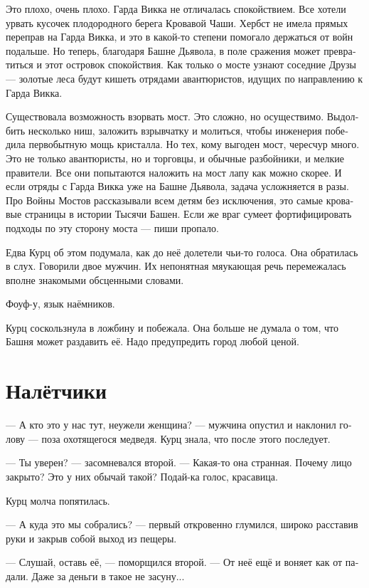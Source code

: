 \documentclass[a4paper,10pt,fleqn]{book}\usepackage{polyglossia}\setdefaultlanguage[babelshorthands=true]{russian}\setotherlanguage{english}\defaultfontfeatures{Ligatures=TeX,Mapping=tex-text}\usepackage{xcolor}\newcommand{\ml}[3]{#2}
\begin{document}
Это плохо, очень плохо.
Гарда Викка не отличалась спокойствием.
Все хотели урвать кусочек плодородного берега Кровавой Чаши.
Хербст не имела прямых переправ на Гарда Викка, и это в какой-то степени помогало держаться от войн подальше.
Но теперь, благодаря Башне Дьявола, в поле сражения может превратиться и этот островок спокойствия.
Как только о мосте узнают соседние Друзы --- золотые леса будут кишеть отрядами авантюристов, идущих по направлению к Гарда Викка.

Существовала возможность взорвать мост.
Это сложно, но осуществимо.
Выдолбить несколько ниш, заложить взрывчатку и молиться, чтобы инженерия победила первобытную мощь кристалла.
Но тех, кому выгоден мост, чересчур много.
Это не только авантюристы, но и торговцы, и обычные разбойники, и мелкие правители.
Все они попытаются наложить на мост лапу как можно скорее.
И если отряды с Гарда Викка уже на Башне Дьявола, задача усложняется в разы.
Про Войны Мостов рассказывали всем детям без исключения, это самые кровавые страницы в истории Тысячи Башен.
Если же враг сумеет фортифицировать подходы по эту сторону моста --- пиши пропало.

Едва Курц об этом подумала, как до неё долетели чьи-то голоса.
Она обратилась в слух.
Говорили двое мужчин.
Их непонятная мяукающая речь перемежалась вполне знакомыми обсценными словами.

Фоуф-у, язык наёмников.

Курц соскользнула в ложбину и побежала.
Она больше не думала о том, что Башня может раздавить её.
Надо предупредить город любой ценой.

\section{Налётчики}

--- А кто это у нас тут, неужели женщина? --- мужчина опустил и наклонил голову --- поза охотящегося медведя.
Курц знала, что после этого последует.

--- Ты уверен? --- засомневался второй.
--- Какая-то она странная.
Почему лицо закрыто?
Это у них обычай такой?
Подай-ка голос, красавица.

Курц молча попятилась.

--- А куда это мы собрались? --- первый откровенно глумился, широко расставив руки и закрыв собой выход из пещеры.

--- Слушай, оставь её, --- поморщился второй.
--- От неё ещё и воняет как от падали.
Даже за деньги в такое не засуну...
\end{document}
